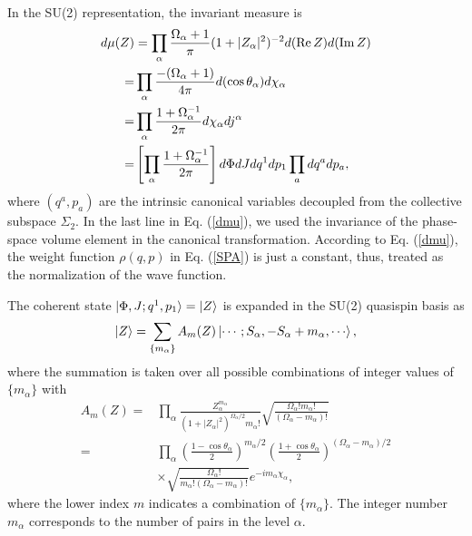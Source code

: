\documentclass[%
superscriptaddress,
showpacs,
nofootinbib,
amsmath,amssymb,
aps,
prc,
twocolumn,
floatfix ]%
{revtex4-1}
\begin{document}
In the SU(2) representation, the invariant measure is
\begin{align}
  d\mu(Z) &= \prod_\alpha \frac{\Omega_\alpha+1}{\pi} (1+|Z_\alpha|^2)^{-2} d({\rm Re}\,Z) d({\rm Im}\,Z) \nonumber \\
=& \prod_\alpha \frac{-(\Omega_\alpha+1)}{4\pi} d(\cos{\theta_\alpha}) d\chi_\alpha \nonumber \\
 =& \prod_\alpha \frac{1+\Omega_\alpha^{-1}}{2\pi} d\chi_\alpha dj^\alpha \nonumber \\
 =& \left[ \prod_\alpha \frac{1+\Omega_\alpha^{-1}}{2\pi} \right] d\Phi dJ dq^1 dp_1 %
  \prod_a dq^a dp_a,
	\label{dmu}
\end{align}
where $(q^a,p_a)$ are the intrinsic canonical variables
decoupled from the collective subspace $\Sigma_2$.
In the last line in Eq. (\ref{dmu}),
we used the invariance of the phase-space volume element
in the canonical transformation.
According to Eq. (\ref{dmu}),
the weight function $\rho(q,p)$ in Eq. (\ref{SPA}) is just a constant,
thus, treated as the normalization of the wave function.

The coherent state $\ket{\Phi,J;q^1,p_1}=\ket{Z}$ is
expanded in the SU(2) quasispin basis as
\begin{align}
\ket{Z} &= 
\sum_{\{m_\alpha\}} A_m(Z) \ket{\cdots;S_\alpha,-S_\alpha+m_\alpha,\cdots}, \nonumber\\
\end{align}
where the summation is taken over all possible combinations
of integer values of $\{ m_\alpha\}$ with
\begin{align}
A_m(Z) =& \prod_\alpha 
\frac{Z_\alpha^{m_\alpha}}
	{\left(1+|Z_\alpha|^2\right)^{\Omega_\alpha/2}m_\alpha!}
\sqrt{\frac{\Omega_\alpha! m_\alpha!}{(\Omega_\alpha-m_\alpha)!}} \nonumber\\
 =& \prod_\alpha \left(\frac{1-\cos{\theta}_\alpha}{2}\right)^{m_\alpha/2}\left(\frac{1+\cos{\theta}_\alpha}{2}\right)^{(\Omega_\alpha-m_\alpha)/2}
  \nonumber \\
  &\times\sqrt{\frac{\Omega_\alpha!}{m_\alpha!(\Omega_\alpha-m_\alpha)!}} e^{-i m_\alpha\chi_\alpha}  ,
	\label{A_m}
\end{align}
where the lower index $m$ indicates a combination of $\{ m_\alpha \}$.
The integer number $m_\alpha$ corresponds to the number of pairs
in the level $\alpha$.
%
\end{document}
